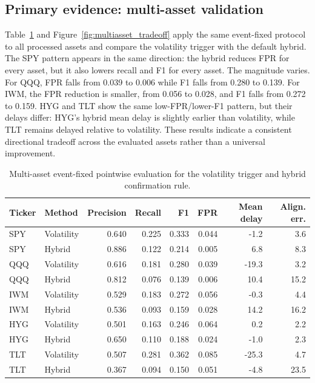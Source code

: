 \documentclass[pdflatex,sn-mathphys-num]{sn-jnl}
\begin{document}
\subsection{Primary evidence: multi-asset validation}
Table~\ref{tab:multiasset_pointwise} and Figure~\ref{fig:multiasset_tradeoff} apply the same event-fixed protocol to all processed assets and compare the volatility trigger with the default hybrid. The SPY pattern appears in the same direction: the hybrid reduces FPR for every asset, but it also lowers recall and F1 for every asset. The magnitude varies. For QQQ, FPR falls from 0.039 to 0.006 while F1 falls from 0.280 to 0.139. For IWM, the FPR reduction is smaller, from 0.056 to 0.028, and F1 falls from 0.272 to 0.159. HYG and TLT show the same low-FPR/lower-F1 pattern, but their delays differ: HYG's hybrid mean delay is slightly earlier than volatility, while TLT remains delayed relative to volatility. These results indicate a consistent directional tradeoff across the evaluated assets rather than a universal improvement.

\begin{table}[t]
\centering
\caption{Multi-asset event-fixed pointwise evaluation for the volatility trigger and hybrid confirmation rule.}
\label{tab:multiasset_pointwise}
\scriptsize
\begin{tabular}{llrrrrrr}
\toprule
Ticker & Method & Precision & Recall & F1 & FPR & Mean delay & Align. err.\\
\midrule
SPY & Volatility & 0.640 & 0.225 & 0.333 & 0.044 & -1.2 & 3.6\\
SPY & Hybrid & 0.886 & 0.122 & 0.214 & 0.005 & 6.8 & 8.3\\
QQQ & Volatility & 0.616 & 0.181 & 0.280 & 0.039 & -19.3 & 3.2\\
QQQ & Hybrid & 0.812 & 0.076 & 0.139 & 0.006 & 10.4 & 15.2\\
IWM & Volatility & 0.529 & 0.183 & 0.272 & 0.056 & -0.3 & 4.4\\
IWM & Hybrid & 0.536 & 0.093 & 0.159 & 0.028 & 14.2 & 16.2\\
HYG & Volatility & 0.501 & 0.163 & 0.246 & 0.064 & 0.2 & 2.2\\
HYG & Hybrid & 0.650 & 0.110 & 0.188 & 0.024 & -1.0 & 2.3\\
TLT & Volatility & 0.507 & 0.281 & 0.362 & 0.085 & -25.3 & 4.7\\
TLT & Hybrid & 0.367 & 0.094 & 0.150 & 0.051 & -4.8 & 23.5\\
\bottomrule
\end{tabular}
\end{table}
\end{document}
